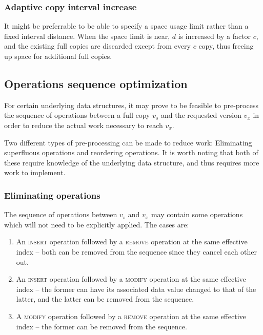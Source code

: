 \subsubsection{Adaptive copy interval increase}
It might be preferrable to be able to specify a space usage limit rather than a
fixed interval distance. When the space limit is near, $d$ is increased by a
factor $c$, and the existing full copies are discarded except from every $c$
copy, thus freeing up space for additional full copies.


\subsection{Operations sequence optimization}
For certain underlying data structures, it may prove to be feasible to
pre-process the sequence of operations between a full copy $v_s$ and the
requested version $v_x$ in order to reduce the actual work necessary to reach
$v_x$.

Two different types of pre-processing can be made to reduce work: Eliminating
superfluous operations and reordering operations. It is worth noting that both
of these require knowledge of the underlying data structure, and thus requires
more work to implement.

\subsubsection{Eliminating operations}
The sequence of operations between $v_s$ and $v_x$ may contain some operations
which will not need to be explicitly applied. The cases are:
\begin{enumerate}
  \item An \textsc{insert} operation followed by a \textsc{remove} operation at
  the same effective index -- both can be removed from the sequence since they
  cancel each other out.
  \label{item:elop-insert-remove}

  \item An \textsc{insert} operation followed by a \textsc{modify} operation at
  the same effective index -- the former can have its associated data value
  changed to that of the latter, and the latter can be removed from the
  sequence.
  \label{item:elop-insert-modify}

  \item A \textsc{modify} operation followed by a \textsc{remove} operation at
  the same effective index -- the former can be removed from the sequence.
  \label{item:elop-modify-remove}
\end{enumerate}

